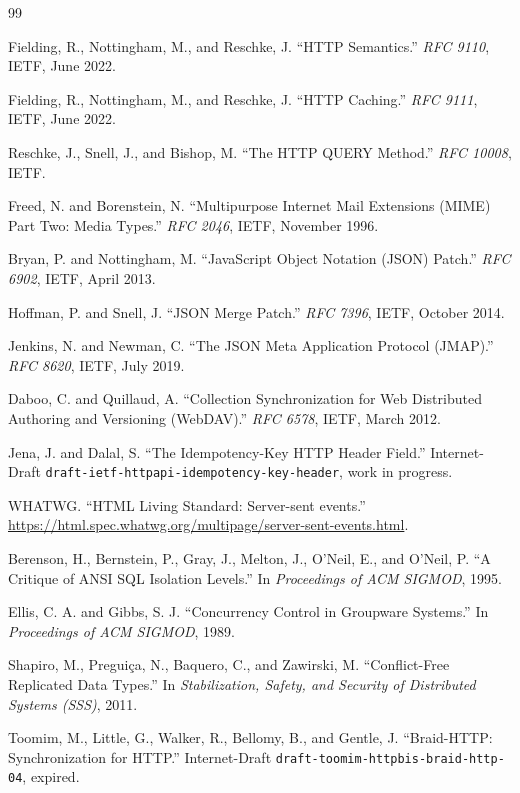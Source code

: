 \documentclass[11pt,a4paper]{article}
\begin{document}
\begin{thebibliography}{99}\raggedright

Fielding, R., Nottingham, M., and Reschke, J. ``HTTP Semantics.'' \textit{RFC 9110}, IETF, June 2022.

Fielding, R., Nottingham, M., and Reschke, J. ``HTTP Caching.'' \textit{RFC 9111}, IETF, June 2022.

Reschke, J., Snell, J., and Bishop, M. ``The HTTP QUERY Method.'' \textit{RFC 10008}, IETF.

Freed, N. and Borenstein, N. ``Multipurpose Internet Mail Extensions (MIME) Part Two: Media Types.'' \textit{RFC 2046}, IETF, November 1996.

Bryan, P. and Nottingham, M. ``JavaScript Object Notation (JSON) Patch.'' \textit{RFC 6902}, IETF, April 2013.

Hoffman, P. and Snell, J. ``JSON Merge Patch.'' \textit{RFC 7396}, IETF, October 2014.

Jenkins, N. and Newman, C. ``The JSON Meta Application Protocol (JMAP).'' \textit{RFC 8620}, IETF, July 2019.

Daboo, C. and Quillaud, A. ``Collection Synchronization for Web Distributed Authoring and Versioning (WebDAV).'' \textit{RFC 6578}, IETF, March 2012.

Jena, J. and Dalal, S. ``The Idempotency-Key HTTP Header Field.'' Internet-Draft \nolinkurl{draft-ietf-httpapi-idempotency-key-header}, work in progress.

WHATWG. ``HTML Living Standard: Server-sent events.'' \url{https://html.spec.whatwg.org/multipage/server-sent-events.html}.

Berenson, H., Bernstein, P., Gray, J., Melton, J., O'Neil, E., and O'Neil, P. ``A Critique of ANSI SQL Isolation Levels.'' In \textit{Proceedings of ACM SIGMOD}, 1995.

Ellis, C. A. and Gibbs, S. J. ``Concurrency Control in Groupware Systems.'' In \textit{Proceedings of ACM SIGMOD}, 1989.

Shapiro, M., Pregui\c{c}a, N., Baquero, C., and Zawirski, M. ``Conflict-Free Replicated Data Types.'' In \textit{Stabilization, Safety, and Security of Distributed Systems (SSS)}, 2011.

Toomim, M., Little, G., Walker, R., Bellomy, B., and Gentle, J. ``Braid-HTTP: Synchronization for HTTP.'' Internet-Draft \nolinkurl{draft-toomim-httpbis-braid-http-04}, expired.


\end{thebibliography}
\end{document}
